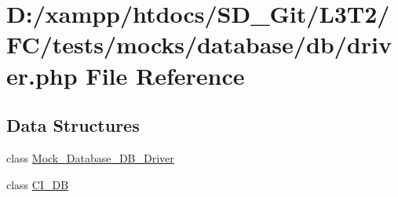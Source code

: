 \hypertarget{tests_2mocks_2database_2db_2_driver_8php}{}\section{D\+:/xampp/htdocs/\+S\+D\+\_\+\+Git/\+L3\+T2/\+F\+C/tests/mocks/database/db/driver.php File Reference}
\label{tests_2mocks_2database_2db_2_driver_8php}
\subsection*{Data Structures}
\begin{DoxyCompactItemize}
\item 
class \hyperlink{class_mock___database___d_b___driver}{Mock\+\_\+\+Database\+\_\+\+D\+B\+\_\+\+Driver}
\item 
class \hyperlink{class_c_i___d_b}{C\+I\+\_\+\+D\+B}
\end{DoxyCompactItemize}
